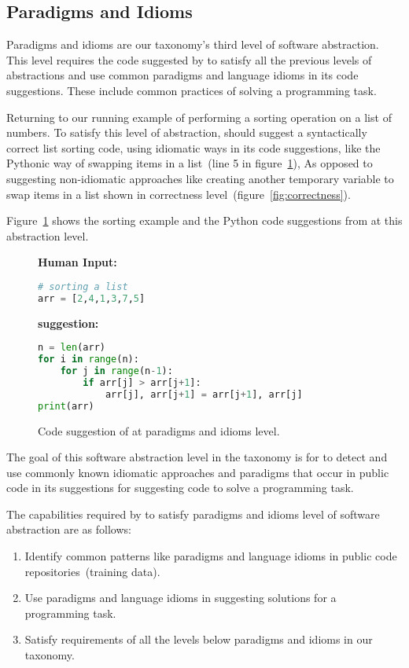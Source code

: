 \subsection{Paradigms and Idioms}
Paradigms and idioms are our taxonomy's third level of software abstraction. 
This level requires the code suggested by \cct{} to satisfy all the previous levels of abstractions and use common paradigms and language idioms in its code suggestions. 
These include common practices of solving a programming task. 

Returning to our running example of performing a sorting operation on a list of numbers. 
To satisfy this level of abstraction, \cct{} should suggest a syntactically correct list sorting code, using idiomatic ways in its code suggestions, like the Pythonic way of swapping items in a list~(line 5 in figure~\ref{fig:idioms}), As opposed to suggesting non-idiomatic approaches like creating another temporary variable to swap items in a list shown in correctness level~(figure~\ref{fig:correctness}).

Figure~\ref{fig:idioms} shows the sorting example and the Python code suggestions from \cct{} at this abstraction level.

\begin{figure}[hbt!]
    \centering
\begin{tcolorbox}[title=Idioms level suggestion for sort routine,boxsep=.15mm]
\textbf{Human Input:}
\begin{lstlisting}[language={Python}]
# sorting a list
arr = [2,4,1,3,7,5]
\end{lstlisting}
\tcbline
\textbf{\cct{} suggestion:}
\begin{lstlisting}[language={Python}]
n = len(arr)
for i in range(n):
	for j in range(n-1):
		if arr[j] > arr[j+1]:
			arr[j], arr[j+1] = arr[j+1], arr[j]
print(arr)
\end{lstlisting}
\end{tcolorbox}
    \caption{Code suggestion of \cct{} at paradigms and idioms level.}
    \label{fig:idioms}
\end{figure}

The goal of this software abstraction level in the taxonomy is for \cct{} to detect and use commonly known idiomatic approaches and paradigms that occur in public code in its suggestions for suggesting code to solve a programming task.

The capabilities required by \cct{} to satisfy paradigms and idioms level of software abstraction are as follows:
\begin{enumerate}
    \item Identify common patterns like paradigms and language idioms in public code repositories~(training data).
    \item Use paradigms and language idioms in suggesting solutions for a programming task.
    \item Satisfy requirements of all the levels below paradigms and idioms in our taxonomy.
\end{enumerate}

